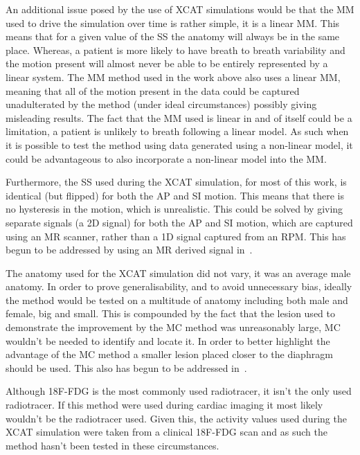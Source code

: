         An additional issue posed by the use of \gls{XCAT} simulations would be that the \gls{MM} used to drive the simulation over time is rather simple, it is a linear \gls{MM}. This means that for a given value of the \gls{SS} the anatomy will always be in the same place. Whereas, a patient is more likely to have breath to breath variability and the motion present will almost never be able to be entirely represented by a linear system. The \gls{MM} method used in the work above also uses a linear \gls{MM}, meaning that all of the motion present in the data could be captured unadulterated by the method (under ideal circumstances) possibly giving misleading results. The fact that the \gls{MM} used is linear in and of itself could be a limitation, a patient is unlikely to breath following a linear model. As such when it is possible to test the method using data generated using a non-linear model, it could be advantageous to also incorporate a non-linear model into the \gls{MM}.
        
        Furthermore, the \gls{SS} used during the \gls{XCAT} simulation, for most of this work, is identical (but flipped) for both the \gls{AP} and \gls{SI} motion. This means that there is no hysteresis in the motion, which is unrealistic. This could be solved by giving separate signals (a \gls{2D} signal) for both the \gls{AP} and \gls{SI} motion, which are captured using an \gls{MR} scanner, rather than a \gls{1D} signal captured from an \gls{RPM}. This has begun to be addressed by using an \gls{MR} derived signal in~.
        
        The anatomy used for the \gls{XCAT} simulation did not vary, it was an average male anatomy. In order to prove generalisability, and to avoid unnecessary bias, ideally the method would be tested on a multitude of anatomy including both male and female, big and small. This is compounded by the fact that the lesion used to demonstrate the improvement by the \gls{MC} method was unreasonably large, \gls{MC} wouldn't be needed to identify and locate it. In order to better highlight the advantage of the \gls{MC} method a smaller lesion placed closer to the diaphragm should be used. This also has begun to be addressed in~.
        
        Although \gls{18F-FDG} is the most commonly used radiotracer, it isn't the only used radiotracer. If this method were used during cardiac imaging it most likely wouldn't be the radiotracer used. Given this, the activity values used during the \gls{XCAT} simulation were taken from a clinical \gls{18F-FDG} scan and as such the method hasn't been tested in these circumstances.
        
